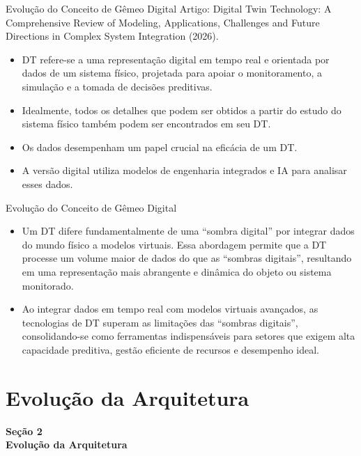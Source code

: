 \documentclass[aspectratio=169,xcolor=dvipsnames]{beamer}
\begin{document}
\begin{frame}{Evolução do Conceito de Gêmeo Digital}
Artigo: Digital Twin Technology: A Comprehensive Review of Modeling, Applications, Challenges and Future Directions in Complex System Integration (2026).

\begin{itemize}
    \item DT refere-se a uma representação digital em tempo real e orientada por dados de um sistema físico, projetada para apoiar o monitoramento, a simulação e a tomada de decisões preditivas. 
    \item  Idealmente, todos os detalhes que podem ser obtidos a partir do estudo do sistema físico também podem ser encontrados em seu DT.
    \item Os dados desempenham um papel crucial na eficácia de um DT.
    \item A versão digital utiliza modelos de engenharia integrados e IA para analisar esses dados. 
\end{itemize}
\end{frame}

\begin{frame}{Evolução do Conceito de Gêmeo Digital}
    \begin{itemize}
        \item Um DT difere fundamentalmente de uma “sombra digital” por integrar dados do mundo físico a modelos virtuais. Essa abordagem permite que a DT processe um volume maior de dados do que as “sombras digitais”, resultando em uma representação mais abrangente e dinâmica do objeto ou sistema monitorado.
        \item  Ao integrar dados em tempo real com modelos virtuais avançados, as tecnologias de DT superam as limitações das “sombras digitais”, consolidando-se como ferramentas indispensáveis para setores que exigem alta capacidade preditiva, gestão eficiente de recursos e desempenho ideal.
    \end{itemize}
\end{frame}

\section{Evolução da Arquitetura}

\begin{frame}[plain]
    \vfill
    \centering
    {\Large\textcolor{dexpiBlue}{\textbf{Seção 2}}}\\[0.8em]
    {\LARGE\textbf{Evolução da Arquitetura}}\\[0.6em]
    \vfill
\end{frame}
\end{document}
